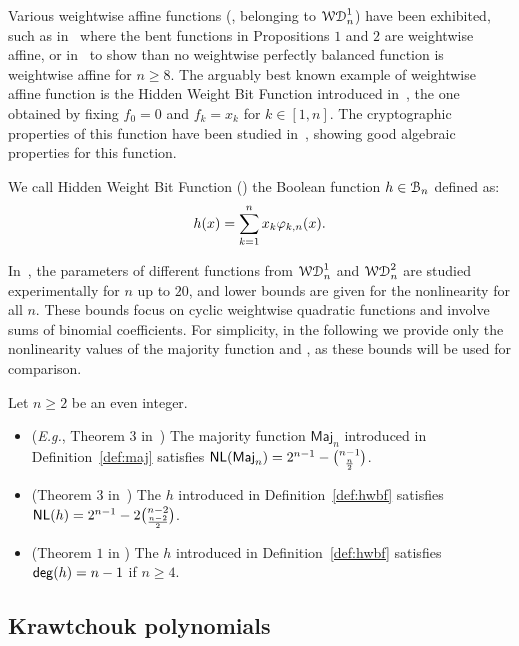 \documentclass{llncs}
\begin{document}
Various weightwise affine functions (\ie, belonging to $\mathcal{WD}^{1}_{n}$) have been exhibited, such as in~\cite{TOSC:CarMeaRot17} where the bent functions in Propositions $1$ and $2$ are weightwise affine, or in~\cite{DAM:GinMea22} to show than no weightwise perfectly balanced function is weightwise affine for $n\geq 8$. The arguably best known example of weightwise affine function is the Hidden Weight Bit Function introduced in~\cite{IEEE:Bryant91}, the one obtained by fixing $f_0=0$ and $f_k=x_k$ for $k \in [1,n]$. The cryptographic properties of this function have been studied in~\cite{DAM:WCST14}, showing good algebraic properties for this function.

\begin{definition}\label{def:hwbf}
    We call Hidden Weight Bit Function (\hwbf{}) the Boolean function $h\in\mathcal{B}_n$ defined as:
	\[
		h(x)=\sum_{k=1}^{n}x_k\varphi_{k,n}(x).
	\]
\end{definition}

In~\cite{DAM:MeaOza24}, the parameters of different functions from $\mathcal{WD}^{1}_{n}$ and $\mathcal{WD}^{2}_{n}$ are studied experimentally for $n$ up to $20$, and lower bounds are given for the nonlinearity for all $n$. These bounds focus on cyclic weightwise quadratic functions and involve sums of binomial coefficients. For simplicity, in the following we provide only the nonlinearity values of the majority function and \hwbf{}, as these bounds will be used for comparison.

\begin{Prop}\label{prop:wwd1}
	Let $n\geq 2$ be an even integer.
	\begin{itemize}
		\item (\textit{E.g.}, Theorem $3$ in~\cite{DCC:DalMaiSar06}) The majority function $\mathsf{Maj}_n$ introduced in Definition~\ref{def:maj} satisfies $\mathsf{NL}(\mathsf{Maj}_n)=2^{n-1}-\binom{n-1}{\frac n2}$.
		\item (Theorem $3$ in~\cite{DAM:WCST14}) The \hwbf{} $h$ introduced in Definition~\ref{def:hwbf} satisfies $\mathsf{NL}(h)=2^{n-1}-2\binom{n-2}{\frac{n-2}{2}}$.
		\item (Theorem $1$ in \cite{DAM:WCST14}) The \hwbf{} $h$ introduced in Definition~\ref{def:hwbf} satisfies $\mathsf{deg}(h)=n-1$ if $n\geq 4$.
	\end{itemize}
\end{Prop}

\subsection{Krawtchouk polynomials}
\end{document}
